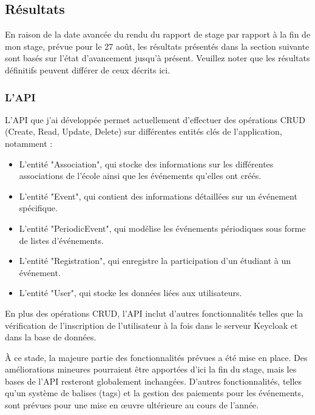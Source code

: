 \subsection{Résultats}

En raison de la date avancée du rendu du rapport de stage par rapport à la fin de mon stage, prévue pour le 27 août, les résultats présentés dans la section suivante sont basés sur l'état d'avancement jusqu'à présent. Veuillez noter que les résultats définitifs peuvent différer de ceux décrits ici.

\subsubsection{L'API}

L'API que j'ai développée permet actuellement d'effectuer des opérations CRUD (Create, Read, Update, Delete) sur différentes entités clés de l'application, notamment :

\begin{itemize}
	\item L'entité "Association", qui stocke des informations sur les différentes associations de l'école ainsi que les événements qu'elles ont créés.
	
	\item L'entité "Event", qui contient des informations détaillées sur un événement spécifique.
	
	\item L'entité "PeriodicEvent", qui modélise les événements périodiques sous forme de listes d'événements.
	
	\item L'entité "Registration", qui enregistre la participation d'un étudiant à un événement.
	
	\item L'entité "User", qui stocke les données liées aux utilisateurs.
\end{itemize}

En plus des opérations CRUD, l'API inclut d'autres fonctionnalités telles que la vérification de l'inscription de l'utilisateur à la fois dans le serveur Keycloak et dans la base de données.

\medskip

À ce stade, la majeure partie des fonctionnalités prévues a été mise en place. Des améliorations mineures pourraient être apportées d'ici la fin du stage, mais les bases de l'API resteront globalement inchangées. D'autres fonctionnalités, telles qu'un système de balises (tags) et la gestion des paiements pour les événements, sont prévues pour une mise en œuvre ultérieure au cours de l'année.

